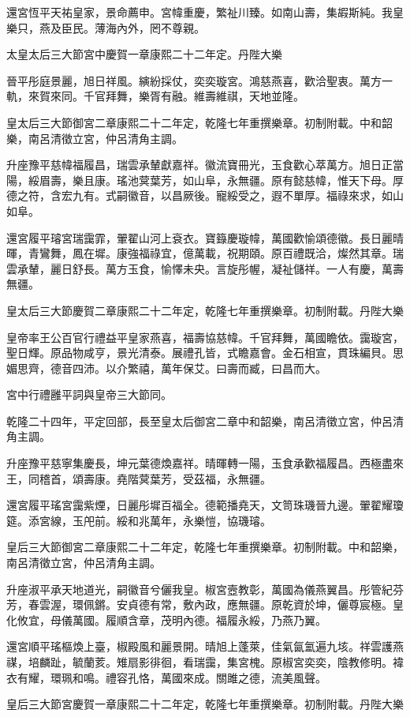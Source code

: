 \begin{pinyinscope}
還宮恆平天祐皇家，景命薦申。宮幃重慶，繁祉川臻。如南山壽，集嘏斯純。我皇樂只，燕及臣民。薄海內外，罔不尊親。

太皇太后三大節宮中慶賀一章康熙二十二年定。丹陛大樂

晉平彤庭景麗，旭日祥風。縯紛採仗，奕奕璇宮。鴻慈燕喜，歡洽聖衷。萬方一軌，來賀來同。千官拜舞，樂胥有融。維壽維祺，天地並隆。

皇太后三大節御宮二章康熙二十二年定，乾隆七年重撰樂章。初制附載。中和韶樂，南呂清徵立宮，仲呂清角主調。

升座豫平慈幃福履昌，瑞雲承輦獻嘉祥。徽流寶冊光，玉食歡心萃萬方。旭日正當陽，綏眉壽，樂且康。瑤池蓂葉芳，如山阜，永無疆。原有懿慈幃，惟天下母。厚德之符，含宏九有。式嗣徽音，以昌厥後。寵綏受之，遐不單厚。福祿來求，如山如阜。

還宮履平璿宮瑞靄霏，翬翟山河上袞衣。寶籙慶璇幃，萬國歡愉頌德徽。長日麗晴暉，青鸞舞，鳳在墀。康強福祿宜，億萬載，祝期頤。原百禮既洽，燦然其章。瑞雲承輦，麗日舒長。萬方玉食，愉懌未央。言旋彤幄，凝祉儲祥。一人有慶，萬壽無疆。

皇太后三大節慶賀二章康熙二十二年定，乾隆七年重撰樂章。初制附載。丹陛大樂

皇帝率王公百官行禮益平皇家燕喜，福壽協慈幃。千官拜舞，萬國瞻依。靄璇宮，聖日輝。原品物咸亨，景光清泰。展禮孔皆，式瞻嘉會。金石相宣，貫珠編貝。思媚思齊，德音四沛。以介繁禧，萬年保艾。曰壽而臧，曰昌而大。

宮中行禮雝平詞與皇帝三大節同。

乾隆二十四年，平定回部，長至皇太后御宮二章中和韶樂，南呂清徵立宮，仲呂清角主調。

升座豫平慈寧集慶長，坤元葉德煥嘉祥。晴暉轉一陽，玉食承歡福履昌。西極盡來王，同稽首，頌壽康。堯階蓂葉芳，受茲福，永無疆。

還宮履平瑤宮靄紫煙，日麗彤墀百福全。德範播堯天，文笥珠璣晉九邊。翬翟耀瓊筵。添宮線，玉戺前。綏和兆萬年，永樂愷，協璣璿。

皇后三大節御宮二章康熙二十二年定，乾隆七年重撰樂章。初制附載。中和韶樂，南呂清徵立宮，仲呂清角主調。

升座淑平承天地道光，嗣徽音兮儷我皇。椒宮壼教彰，萬國為儀燕翼昌。彤管紀芬芳，春雲渥，環佩鏘。安貞德有常，敷內政，應無疆。原乾資於坤，儷尊宸極。皇化攸宜，母儀萬國。履順含章，茂明內德。福履永綏，乃燕乃翼。

還宮順平瑤樞煥上臺，椒殿風和麗景開。晴旭上蓬萊，佳氣氤氳遍九垓。祥雲護燕禖，培麟趾，毓蘭荄。雉扇影徘徊，看瑞靄，集宮槐。原椒宮奕奕，陰教修明。褘衣有耀，環珮和鳴。禮容孔恪，萬國來成。關雎之德，流美風聲。

皇后三大節宮慶賀一章康熙二十二年定，乾隆七年重撰樂章。初制附載。丹陛大樂


\end{pinyinscope}
